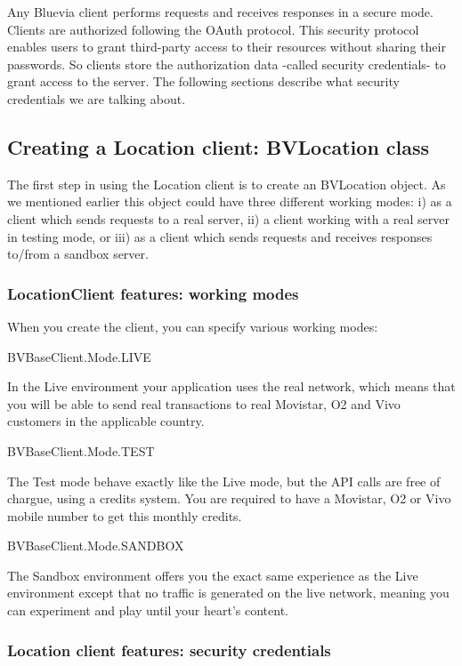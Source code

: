 Any Bluevia client performs requests and receives responses in a secure mode. Clients are authorized following the OAuth protocol. This security protocol enables users to grant third-\/party access to their resources without sharing their passwords. So clients store the authorization data -\/called security credentials-\/ to grant access to the server. The following sections describe what security credentials we are talking about.\hypertarget{blv_location_guide_creating_a_location_client_sec}{}\subsection{Creating a Location client: BVLocation class}\label{blv_location_guide_creating_a_location_client_sec}
The first step in using the Location client is to create an BVLocation object. As we mentioned earlier this object could have three different working modes: i) as a client which sends requests to a real server, ii) a client working with a real server in testing mode, or iii) as a client which sends requests and receives responses to/from a sandbox server.\hypertarget{blv_location_guide_locationclient_features_working_modes_sec}{}\subsubsection{LocationClient features: working modes}\label{blv_location_guide_locationclient_features_working_modes_sec}
When you create the client, you can specify various working modes: 
\begin{DoxyItemize}
\item BVBaseClient.Mode.LIVE \par
In the Live environment your application uses the real network, which means that you will be able to send real transactions to real Movistar, O2 and Vivo customers in the applicable country.


\item BVBaseClient.Mode.TEST \par
The Test mode behave exactly like the Live mode, but the API calls are free of chargue, using a credits system. You are required to have a Movistar, O2 or Vivo mobile number to get this monthly credits.


\item BVBaseClient.Mode.SANDBOX \par
The Sandbox environment offers you the exact same experience as the Live environment except that no traffic is generated on the live network, meaning you can experiment and play until your heart’s content. 
\end{DoxyItemize}\hypertarget{blv_location_guide_locationclient_features_security_credentials_sec}{}\subsubsection{Location client features: security credentials}\label{blv_location_guide_locationclient_features_security_credentials_sec}
